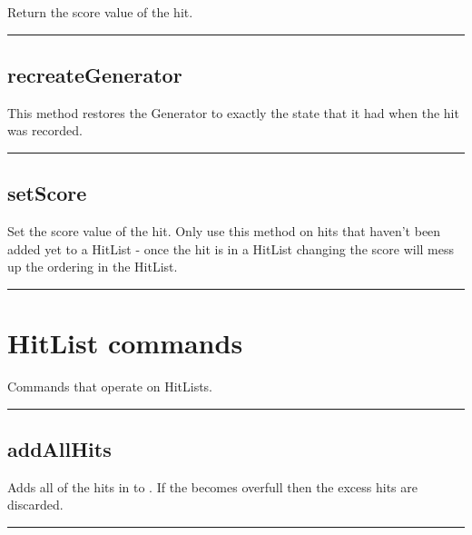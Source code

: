 \begin{itemize}
  Return the score value of the hit.

\rule{6in}{0.01cm}\par
{}\par
\subsection{recreateGenerator}

  This method restores the Generator to exactly the state that it had when the hit was recorded.

\rule{6in}{0.01cm}\par
{}\par
\subsection{setScore}

  Set the score value of the hit.  Only use this method on hits that haven't been added yet to a HitList - once the hit is in a HitList changing the score will mess up the ordering in the HitList.

\rule{6in}{0.01cm}\par
{}\par
\section{HitList commands}
  Commands that operate on HitLists.

\rule{6in}{0.01cm}\par
{}\par
\subsection{addAllHits}
  \par
  Adds all of the hits in  to . If the  becomes overfull then the excess hits are discarded.

\rule{6in}{0.01cm}\par
{}\par

\end{itemize}
